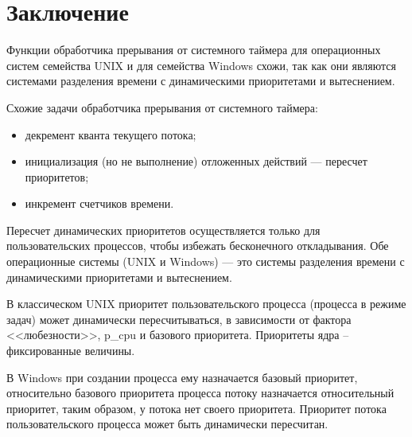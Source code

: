\section*{Заключение}
{}

Функции обработчика прерывания от системного таймера для операционных систем семейства UNIX и для семейства Windows схожи, так как они являются системами разделения времени с динамическими приоритетами и вытеснением.

Схожие задачи обработчика прерывания от системного таймера:
\begin{itemize}
	\item декремент кванта текущего потока;
	\item инициализация (но не выполнение) отложенных действий --- пересчет приоритетов;
	\item инкремент счетчиков времени.
\end{itemize}

Пересчет динамических приоритетов осуществляется только для пользовательских процессов, чтобы избежать бесконечного откладывания. Обе операционные системы (UNIX и Windows) --- это системы разделения времени с динамическими приоритетами и вытеснением.

В классическом UNIX приоритет пользовательского процесса (процесса в режиме задач) может динамически пересчитываться, в зависимости от фактора <<любезности>>, p\_cpu и базового приоритета. Приоритеты ядра – фиксированные величины.

В Windows при создании процесса ему назначается базовый приоритет, относительно базового приоритета процесса потоку назначается относительный приоритет, таким образом, у потока нет своего приоритета. Приоритет потока пользовательского процесса может быть динамически пересчитан.
\newpage